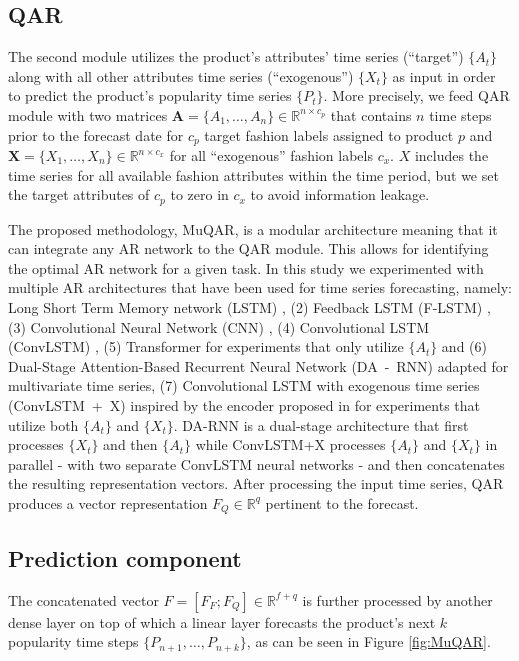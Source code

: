 \documentclass{article}
\begin{document}
\subsection{QAR}
The second module utilizes the product’s attributes' time series (``target'') $\{A_t\}$ along with all other attributes time series (``exogenous'') $\{X_t\}$ as input in order to predict the product's popularity time series $\{P_t\}$. 
More precisely, we feed QAR module with two matrices $\textbf{A}=\{A_1,\dots,A_n\}\in\mathbb{R}^{n\times c_p}$ 
that contains $n$ time steps prior to the forecast date for $c_p$ target fashion labels assigned to product $p$ and $\textbf{X}=\{X_1,\dots,X_n\}\in\mathbb{R}^{n\times c_x}$ for all ``exogenous'' fashion labels $c_x$. 
$X$ includes the time series for all available fashion attributes within the time period, but we set the target attributes of $c_p$ to zero in $c_x$ to avoid information leakage.

The proposed methodology, MuQAR, is a modular architecture meaning that it can integrate any AR network to the QAR module. This allows for identifying the optimal AR network for a given task. In this study we experimented with multiple AR architectures that have been used for time series forecasting, namely: 
 Long Short Term Memory network (LSTM) \cite{hochreiter1997long}, 
 (2) Feedback LSTM (F-LSTM) \cite{graves2013generating}, (3) Convolutional Neural Network (CNN) \cite{zhao2017convolutional}, (4) Convolutional LSTM (ConvLSTM) \cite{xingjian2015convolutional}, (5) Transformer \cite{vaswani2017attention} 
for experiments that only utilize $\{A_t\}$ 
and (6) Dual-Stage Attention-Based Recurrent Neural Network (DA~-~RNN) \cite{qin2017dual} adapted for multivariate time series, (7) Convolutional LSTM with exogenous time series (ConvLSTM~+~X) inspired by the encoder proposed in \cite{chang2018memory} for experiments that utilize both  $\{A_t\}$ and $\{X_t\}$. 
DA-RNN is a dual-stage architecture that first processes $\{X_t\}$ and then $\{A_t\}$ while ConvLSTM+X processes $\{A_t\}$ and $\{X_t\}$ in parallel - with two separate ConvLSTM neural networks - and then concatenates the resulting representation vectors.
After processing the input time series, QAR produces a vector representation $F_Q\in\mathbb{R}^{q}$ pertinent to the forecast.

\subsection{Prediction component}
The concatenated vector $F=[F_F;F_Q]\in\mathbb{R}^{f+q}$ is further processed by another dense layer on top of which a linear layer forecasts the product's next $k$ popularity time steps $\{P_{n+1},\dots,P_{n+k}\}$, as can be seen in Figure \ref{fig:MuQAR}. 
\end{document}
